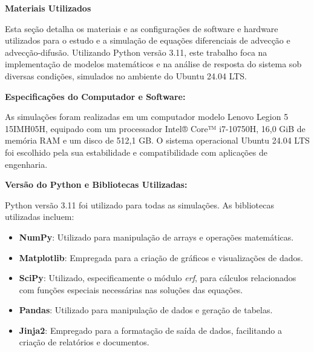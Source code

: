 \begin{titlepage}
    \thispagestyle{empty} %

    \noindent\textbf{\Large Materiais Utilizados}

    \vspace{1cm} %

    Esta seção detalha os materiais e as configurações de software e hardware utilizados para o estudo e a simulação de equações diferenciais de advecção e advecção-difusão. Utilizando Python versão 3.11, este trabalho foca na implementação de modelos matemáticos e na análise de resposta do sistema sob diversas condições, simulados no ambiente do Ubuntu 24.04 LTS.

    \vspace{0.3cm} %

    \textbf{Especificações do Computador e Software:}

    As simulações foram realizadas em um computador modelo Lenovo Legion 5 15IMH05H, equipado com um processador Intel® Core™ i7-10750H, 16,0 GiB de memória RAM e um disco de 512,1 GB. O sistema operacional Ubuntu 24.04 LTS foi escolhido pela sua estabilidade e compatibilidade com aplicações de engenharia.

    \vspace{0.3cm} %

    \textbf{Versão do Python e Bibliotecas Utilizadas:}

    Python versão 3.11 foi utilizado para todas as simulações. As bibliotecas utilizadas incluem:
    \begin{itemize}
        \item \textbf{NumPy}: Utilizado para manipulação de arrays e operações matemáticas.
        \item \textbf{Matplotlib}: Empregada para a criação de gráficos e visualizações de dados.
        \item \textbf{SciPy}: Utilizado, especificamente o módulo \textit{erf}, para cálculos relacionados com funções especiais necessárias nas soluções das equações.
        \item \textbf{Pandas}: Utilizado para manipulação de dados e geração de tabelas.
        \item \textbf{Jinja2}: Empregado para a formatação de saída de dados, facilitando a criação de relatórios e documentos.
    \end{itemize}

\end{titlepage}
